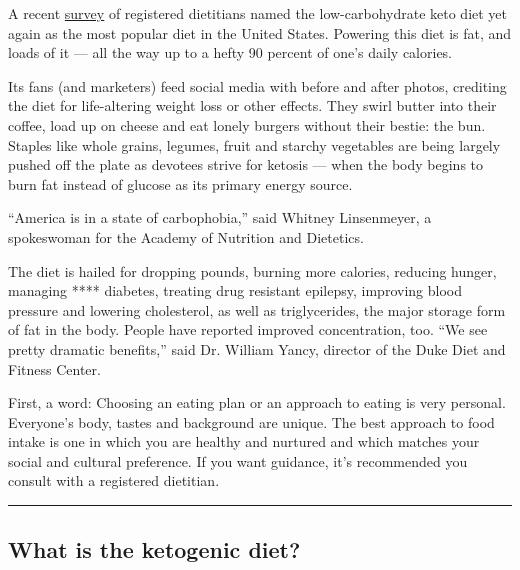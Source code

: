 A recent
\href{https://www.lpollockpr.com/in-the-news/nutrition-experts-forecast-2020-will-usher-in-the-ultimate-food-revolution/}{survey}
of registered dietitians named the low-carbohydrate keto diet yet again
as the most popular diet in the United States. Powering this diet is
fat, and loads of it --- all the way up to a hefty 90 percent of one's
daily calories.

Its fans (and marketers) feed social media with before and after photos,
crediting the diet for life-altering weight loss or other effects. They
swirl butter into their coffee, load up on cheese and eat lonely burgers
without their bestie: the bun. Staples like whole grains, legumes, fruit
and starchy vegetables are being largely pushed off the plate as
devotees strive for ketosis --- when the body begins to burn fat instead
of glucose as its primary energy source.

``America is in a state of carbophobia,'' said Whitney Linsenmeyer, a
spokeswoman for the Academy of Nutrition and Dietetics.

The diet is hailed for dropping pounds, burning more calories, reducing
hunger, managing **** diabetes, treating drug resistant epilepsy,
improving blood pressure and lowering cholesterol, as well as
triglycerides, the major storage form of fat in the body. People have
reported improved concentration, too. ``We see pretty dramatic
benefits,'' said Dr. William Yancy, director of the Duke Diet and
Fitness Center.

First, a word: Choosing an eating plan or an approach to eating is very
personal. Everyone's body, tastes and background are unique. The best
approach to food intake is one in which you are healthy and nurtured and
which matches your social and cultural preference. If you want guidance,
it's recommended you consult with a registered dietitian.

\begin{center}\rule{0.5\linewidth}{\linethickness}\end{center}

\hypertarget{what-is-the-ketogenic-diet}{%
\subsection{What is the ketogenic
diet?}\label{what-is-the-ketogenic-diet}}

